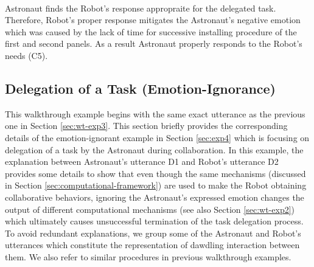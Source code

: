 \noindent{}\\

Astronaut finds the Robot's response appropraite for the delegated task.
Therefore, Robot's proper response mitigates the Astronaut's negative emotion
which was caused by the lack of time for successive installing procedure of the
first and second panels. As a result Astronaut properly responds to the Robot's
needs (C5).\\

\noindent{}

\subsection{Delegation of a Task (Emotion-Ignorance)}
\label{sec:wt-exp4}

This walkthrough example begins with the same exact utterance as the previous
one in Section \ref{sec:wt-exp3}. This section briefly provides the
corresponding details of the emotion-ignorant example in Section \ref{sec:exp4}
which is focusing on delegation of a task by the Astronaut during collaboration.
In this example, the explanation between Astronaut's utterance D1 and Robot's
utterance D2 provides some details to show that even though the same mechanisms
(discussed in Section \ref{sec:computational-framework}) are used to make the
Robot obtaining collaborative behaviors, ignoring the Astronaut's expressed
emotion changes the output of different computational mechanisms (see also
Section \ref{sec:wt-exp2}) which ultimately causes unsuccessful termination of
the task delegation process. To avoid redundant explanations, we group some of
the Astronaut and Robot's utterances which constitute the representation of
dawdling interaction between them. We also refer to similar procedures in
previous walkthrough examples.\\

\noindent{}\\

